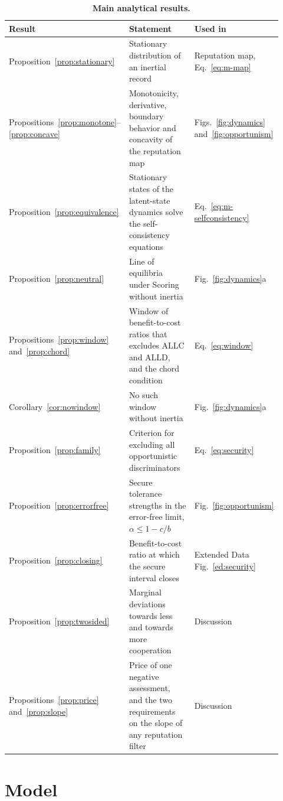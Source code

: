 \documentclass[10pt]{wlscirep}
\theoremstyle{plain}
\theoremstyle{remark}
\begin{document}
\begin{table}[!htbp]
\centering
\caption{\textbf{Main analytical results.}}
\label{tab:si-overview}
\small
\begin{tabular}{@{}p{0.2\linewidth}p{0.5\linewidth}p{0.22\linewidth}@{}}
\toprule
Result & Statement & Used in\\
\midrule
Proposition~\ref{prop:stationary} & Stationary distribution of an inertial record & Reputation map, Eq.~\eqref{eq:m-map}\\
Propositions~\ref{prop:monotone}--\ref{prop:concave} & Monotonicity, derivative, boundary behavior and concavity of the reputation map & Figs.~\ref{fig:dynamics} and~\ref{fig:opportunism}\\
Proposition~\ref{prop:equivalence} & Stationary states of the latent-state dynamics solve the self-consistency equations & Eq.~\eqref{eq:m-selfconsistency}\\
Proposition~\ref{prop:neutral} & Line of equilibria under Scoring without inertia & Fig.~\ref{fig:dynamics}a\\
Propositions~\ref{prop:window} and~\ref{prop:chord} & Window of benefit-to-cost ratios that excludes ALLC and ALLD, and the chord condition & Eq.~\eqref{eq:window}\\
Corollary~\ref{cor:nowindow} & No such window without inertia & Fig.~\ref{fig:dynamics}a\\
Proposition~\ref{prop:family} & Criterion for excluding all opportunistic discriminators & Eq.~\eqref{eq:security}\\
Proposition~\ref{prop:errorfree} & Secure tolerance strengths in the error-free limit, $\alpha\leq1-c/b$ & Fig.~\ref{fig:opportunism}\\
Proposition~\ref{prop:closing} & Benefit-to-cost ratio at which the secure interval closes & Extended Data Fig.~\ref{ed:security}\\
Proposition~\ref{prop:twosided} & Marginal deviations towards less and towards more cooperation & Discussion\\
Propositions~\ref{prop:price} and~\ref{prop:slope} & Price of one negative assessment, and the two requirements on the slope of any reputation filter & Discussion\\
\bottomrule
\end{tabular}
\end{table}

\FloatBarrier
\section{Model}
\label{si:model}
\end{document}
